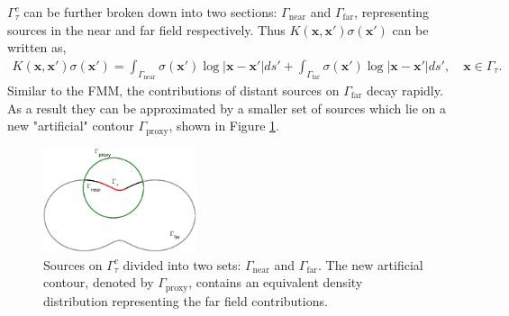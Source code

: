 \documentclass{sfuthesis}
\begin{document}
$\Gamma_\tau^c$ can be further broken down into two sections: $\Gamma_{\text{near}}$ and $\Gamma_{\text{far}}$, representing sources in the near and far field respectively. Thus $K(\mathbf{x}, \mathbf{x}')\sigma(\mathbf{x}')$ can be written as, 
\begin{align*}
	K(\mathbf{x}, \mathbf{x}')\sigma(\mathbf{x}') = \int_{\Gamma_{\text{near}}} \sigma(\mathbf{x}') \log|\mathbf{x}-\mathbf{x}'|ds' + \int_{\Gamma_{\text{far}}} \sigma(\mathbf{x}') \log|\mathbf{x}-\mathbf{x}'|ds', \quad \mathbf{x}\in \Gamma_\tau. 
\end{align*}
Similar to the FMM, the contributions of distant sources on $\Gamma_{\text{far}}$ decay rapidly. As a result they can be approximated by a smaller set of sources which lie on a new "artificial" contour $\Gamma_{\text{proxy}}$, shown in Figure \ref{fig: 2DGammaTauNearFarProxy}. 

\begin{figure}[h]
	\centering
	\includegraphics[width=0.4\textwidth]{2DGammaTauNearFarProxy}
	\caption{Sources on $\Gamma_\tau^c$ divided into two sets: $\Gamma_{\text{near}}$ and $\Gamma_{\text{far}}$. The new artificial contour, denoted by $\Gamma_{\text{proxy}}$, contains an equivalent density distribution representing the far field contributions. }
	\label{fig: 2DGammaTauNearFarProxy}
\end{figure}
\end{document}
